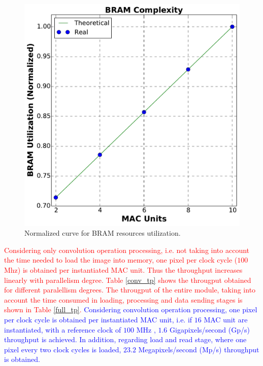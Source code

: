 \documentclass[conference,compsoc]{IEEEtran}
\begin{document}
\begin{figure}[!t]
\centering
\includegraphics[scale=0.3]{BRAM_c2}
\caption{Normalized curve for BRAM resources utilization.}
\label{bram_n}
\end{figure}

\textcolor{red}{
Considering only convolution operation processing, i.e. not taking into account
the time needed to load the image into memory, one pixel per clock cycle ($100$ Mhz) is
obtained per instantiated MAC unit. Thus the throughput increases linearly with
parallelism degree. Table \ref{conv_tp} shows the througput obtained for
different paralellism degrees. The througput of the entire module, taking into
account the time consumed in loading, processing and data sending stages is shown in Table
\ref{full_tp}.
}
\textcolor{blue}{
Considering convolution operation processing, one pixel per clock cycle is
obtained per instantiated MAC unit, i.e. if $16$ MAC unit are instantiated,
with a reference clock of $100$ MHz , $1.6$ Gigapixels/second (Gp/s) throughput
is achieved. In addition, regarding load and read stage, where one pixel every
two clock cycles is loaded, $23.2$ Megapixels/second (Mp/s) throughput is
obtained.
}
\end{document}

